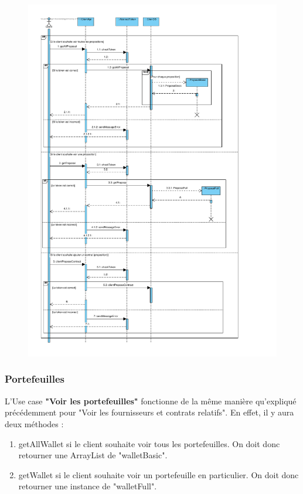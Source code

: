 \newpage
\begin{figure}[h]
\centering
\includegraphics[height = 1.2\textwidth]{Base/sequence/img/client/seqFCRe.pdf}
\end{figure}

\newpage

\subsubsection{Portefeuilles}
\begin{flushleft}
L'Use case \textbf{"Voir les portefeuilles"} fonctionne de la même manière qu'expliqué précédemment pour "Voir les fournisseurs et contrats relatifs".
En effet, il y aura deux méthodes : 
\end{flushleft}
\begin{enumerate}
\item getAllWallet si le client souhaite voir tous les portefeuilles. On doit donc retourner une ArrayList de "walletBasic".
\item getWallet si le client souhaite voir un portefeuille en particulier. On doit donc retourner une instance de "walletFull".
\end{enumerate}


